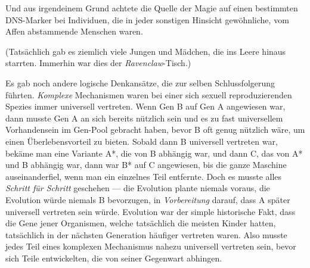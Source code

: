 Und aus irgendeinem Grund achtete die Quelle der Magie auf einen bestimmten DNS-Marker bei Individuen, die in jeder sonstigen Hinsicht gewöhnliche, vom Affen abstammende Menschen waren.

(Tatsächlich gab es ziemlich viele Jungen und Mädchen, die ins Leere hinaus starrten. Immerhin war dies der \emph{Ravenclaw}-Tisch.)

Es gab noch andere logische Denkansätze, die zur selben Schlussfolgerung führten. \emph{Komplexe} Mechanismen waren bei einer sich sexuell reproduzierenden Spezies immer universell vertreten. Wenn Gen B auf Gen A angewiesen war, dann musste Gen A an sich bereits nützlich sein und es zu fast universellem Vorhandensein im Gen-Pool gebracht haben, bevor B oft genug nützlich wäre, um einen Überlebensvorteil zu bieten. Sobald dann B universell vertreten war, bekäme man eine Variante A*, die von B abhängig war, und dann C, das von A* und B abhängig war, dann war B* auf C angewiesen, bis die ganze Maschine auseinanderfiel, wenn man ein einzelnes Teil entfernte. Doch es musste alles \emph{Schritt für Schritt} geschehen — die Evolution plante niemals voraus, die Evolution würde niemals B bevorzugen, in \emph{Vorbereitung} darauf, dass A später universell vertreten sein würde. Evolution war der simple historische Fakt, dass die Gene jener Organismen, welche tatsächlich die meisten Kinder hatten, tatsächlich in der nächsten Generation häufiger vertreten waren. Also musste jedes Teil eines komplexen Mechanismus nahezu universell vertreten sein, bevor sich Teile entwickelten, die von seiner Gegenwart abhingen.


